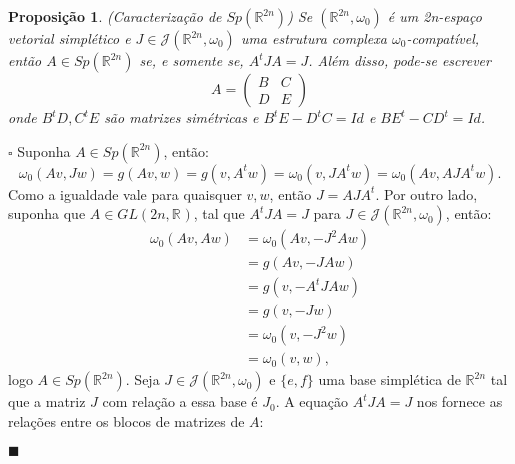 \documentclass[12pt]{book}
\newtheorem{proposicao}[teorema]{Proposição}
\newenvironment{prova}[1]{$\square$ #1}{\hfill$\blacksquare$}
\newcommand{\estruturacomplexa}{J_{0}}
\newcommand{\estruturascomplexas}[2]{\mathcal{J}(#1, #2)}
\newcommand{\formaSimpleticaabrev}{\omega_{0}}
\newcommand{\generalgroup}[2]{GL(#1, #2)}
\newcommand{\generalgroupreal}[1]{\generalgroup{#1}{\real{}}}
\newcommand{\gruposimpletico}[1]{Sp(#1)}
\newcommand{\real}[1]{\mathbb{R}^{#1}}
\begin{document}
	\begin{proposicao}\label{proposicao_caracterizacao_Sp2n}
		(Caracterização de $\gruposimpletico{\real{2n}}$) Se $(\real{2n}, \omega_{0})$ é um 2n-espaço vetorial simplético e $J \in \estruturascomplexas{\real{2n}}{\omega_{0}}$ uma estrutura complexa $\omega_{0}$-compatível, então $A\in \gruposimpletico{\real{2n}}$ se, e somente se, $A^{t}JA = J$. Além disso, pode-se escrever 
		$$
		A=
		\left(
		\begin{array}{cc}
		B & C
		\\
		D & E
		\end{array}
		\right)
		$$
		onde $B^{t}D, C^{t}E$ são matrizes simétricas e $B^{t}E - D^{t}C = Id$ e $BE^{t} - CD^{t} = Id$.
	\end{proposicao}
	\begin{prova}
		Suponha $A \in \gruposimpletico{\real{2n}}$, então:
		$$
		\formaSimpleticaabrev(Av, Jw)= g(Av,w) = g(v,A^{t}w) = \formaSimpleticaabrev(v, JA^{t}w) = \formaSimpleticaabrev(Av, AJA^{t}w).
		$$
		Como a igualdade vale para quaisquer $v,w$, então $J = AJA^{t}$. Por outro lado, suponha que $A \in \generalgroupreal{2n}$, tal que $A^{t}JA=J$ para $J \in \estruturascomplexas{\real{2n}}{\formaSimpleticaabrev}$, então:
		$$
		\begin{aligned}
		\formaSimpleticaabrev(Av, Aw) &= \formaSimpleticaabrev(Av, -J^{2}Aw)
		\\
		&=g(Av, -JAw) 
		\\
		&= g(v, -A^{t}JAw) 
		\\
		&= g(v, -Jw) 
		\\
		&= \formaSimpleticaabrev(v, -J^{2}w) 
		\\
		&= \formaSimpleticaabrev(v, w), 
		\end{aligned}
		$$
		logo $A \in \gruposimpletico{\real{2n}}$. Seja $J \in \estruturascomplexas{\real{2n}}{\formaSimpleticaabrev}$ e $\{e, f\}$ uma base simplética de $\real{2n}$ tal que a matriz $J$ com relação a essa base é $\estruturacomplexa$. A equação $A^{t}JA=J$ nos fornece as relações entre os blocos de matrizes de $A$:
		

\end{prova}
\end{document}
